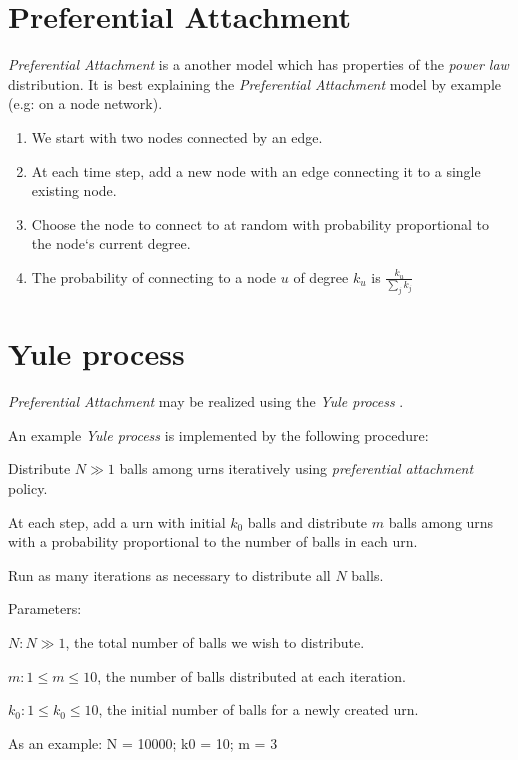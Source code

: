 \documentclass[a4paper, 12pt]{report}
\begin{document}
\section{Preferential Attachment}
\textit{Preferential Attachment} is a another model which has properties of the \textit{power law} distribution. It is best explaining the \textit{Preferential Attachment} model by example (e.g: on a node network).
\begin{enumerate}
\small
    \item We start with two nodes connected by an edge.
    \item At each time step, add a new node with an edge connecting it to a single existing node. 
    \item Choose the node to connect to at random with probability proportional to the node`s current degree.
    \item The probability of connecting to a node $u$ of degree $k_u$ is $\frac{k_u}{\sum_j{k_j}}$
\end{enumerate}

\section{Yule process}
\textit{Preferential Attachment} may be realized using the \textit{Yule process}  \cite{yule-simon-distribution}.

An example \textit{Yule process} is implemented by the following procedure:

Distribute $N \gg 1$ balls among urns iteratively using \textit{preferential attachment} policy.

At each step, add a urn with initial $k_0$ balls and distribute $m$ balls among urns with a probability proportional to the number of balls in each urn.

Run as many iterations as necessary to distribute all $N$ balls.

Parameters:
\small
\begin{addmargin}[1cm]{1cm}%
    $N: N \gg 1$, the total number of balls we wish to distribute.
    
    $m: 1 \leq m \leq 10$, the number of balls distributed at each iteration.
    
    $k_0: 1 \leq k_0 \leq 10$, the initial number of balls for a newly created urn.
\end{addmargin}

{\selectfont
As an example: N = 10000; k0 = 10; m = 3
}
\end{document}

